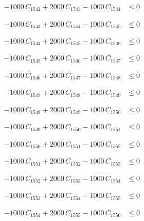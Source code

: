 \documentclass[a4paper,11pt]{article}
\begin{document}
\begin{align}
-1000\,C_{1542} + 2000\,C_{1543} - 1000\,C_{1544} &\leq 0 \nonumber
\end{align}

\begin{align}
-1000\,C_{1543} + 2000\,C_{1544} - 1000\,C_{1545} &\leq 0 \nonumber
\end{align}

\begin{align}
-1000\,C_{1544} + 2000\,C_{1545} - 1000\,C_{1546} &\leq 0 \nonumber
\end{align}

\begin{align}
-1000\,C_{1545} + 2000\,C_{1546} - 1000\,C_{1547} &\leq 0 \nonumber
\end{align}

\begin{align}
-1000\,C_{1546} + 2000\,C_{1547} - 1000\,C_{1548} &\leq 0 \nonumber
\end{align}

\begin{align}
-1000\,C_{1547} + 2000\,C_{1548} - 1000\,C_{1549} &\leq 0 \nonumber
\end{align}

\begin{align}
-1000\,C_{1548} + 2000\,C_{1549} - 1000\,C_{1550} &\leq 0 \nonumber
\end{align}

\begin{align}
-1000\,C_{1549} + 2000\,C_{1550} - 1000\,C_{1551} &\leq 0 \nonumber
\end{align}

\begin{align}
-1000\,C_{1550} + 2000\,C_{1551} - 1000\,C_{1552} &\leq 0 \nonumber
\end{align}

\begin{align}
-1000\,C_{1551} + 2000\,C_{1552} - 1000\,C_{1553} &\leq 0 \nonumber
\end{align}

\begin{align}
-1000\,C_{1552} + 2000\,C_{1553} - 1000\,C_{1554} &\leq 0 \nonumber
\end{align}

\begin{align}
-1000\,C_{1553} + 2000\,C_{1554} - 1000\,C_{1555} &\leq 0 \nonumber
\end{align}

\begin{align}
-1000\,C_{1554} + 2000\,C_{1555} - 1000\,C_{1556} &\leq 0 \nonumber
\end{align}
\end{document}
